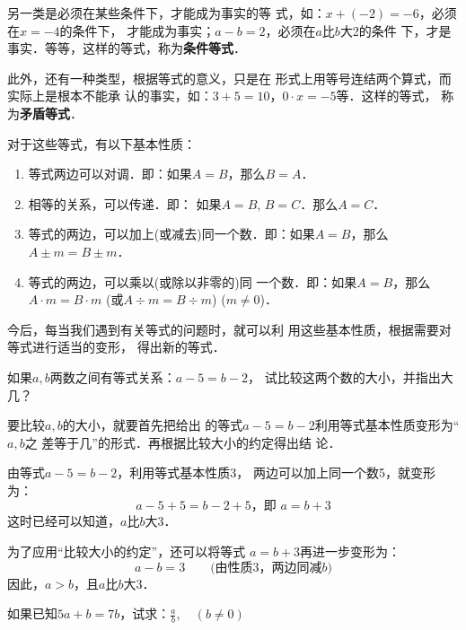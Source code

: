 另一类是必须在某些条件下，才能成为事实的等
式，如：$x+(-2)=-6$，必须在$x=-4$的条件下，
才能成为事实；$a-b=2$，必须在$a$比$b$大2的条件
下，才是事实．等等，这样的等式，称为\textbf{条件等式}．

此外，还有一种类型，根据等式的意义，只是在
形式上用等号连结两个算式，而实际上是根本不能承
认的事实，如：$3+5=10$，$0\cdot x=-5$等．这样的等式，
称为\textbf{矛盾等式}．

对于这些等式，有以下基本性质：

\begin{blk}{}
	\begin{enumerate}
		\item 等式两边可以对调．即：如果$A= B$，那么$B=A$．
		\item 相等的关系，可以传递．即：
		如果$A=B$,  $B=C$．那么$A=C$．
		\item 等式的两边，可以加上(或减去)同一个数．即：如果$A= B$，那么$A\pm m=B\pm m$．
		\item 等式的两边，可以乘以(或除以非零的)同
		一个数．即：如果$A=B$，那么$A\cdot m=B\cdot m$ (或$A\div m =
		B\div m$) ($m\ne 0$)．
	\end{enumerate}
\end{blk}


今后，每当我们遇到有关等式的问题时，就可以利
用这些基本性质，根据需要对等式进行适当的变形，
得出新的等式．

\begin{example}
	如果$a,b$两数之间有等式关系：$a-5=b-2$，
	试比较这两个数的大小，并指出大几？
\end{example}

\begin{analyze}
	要比较$a,b$的大小，就要首先把给出
	的等式$a-5=b-2$利用等式基本性质变形为“$a, b$之
	差等于几”的形式．再根据比较大小的约定得出结
	论．
\end{analyze}

\begin{solution}
	由等式$a-5=b-2$，利用等式基本性质3，
	两边可以加上同一个数5，就变形为：
	\[a-5+5=b-2+5，\text{即 } a=b+3\]
	这时已经可以知道，$a$比$b$大3．
	
	为了应用“比较大小的约定”，还可以将等式
	$a=b+3$再进一步变形为：
	\[a-b=3\qquad \text{(由性质3，两边同减$b$)}\]
	因此，$a>b$，且$a$比$b$大3．
\end{solution}

\begin{example}
	如果已知$5a + b = 7b$，试求：$\frac{a}{b},\quad (b\ne 0)$
\end{example}

